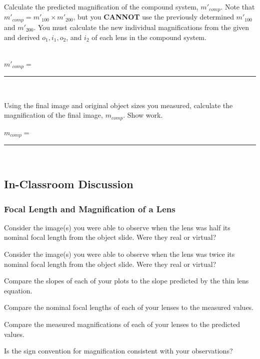 \noindent
Calculate the predicted magnification of the compound system, $m'_{comp}$.
Note that $m'_{comp}=m'_{100}\times m'_{200}$, but you
{\bf CANNOT} use the previously determined $m'_{100}$ and $m'_{200}$. You must
calculate the new individual magnifications from the given and derived
$o_1, i_1, o_2$, and $i_2$ of each lens in the compound system. \\
\vspace*{2cm} \\
\begin{center}
$m'_{comp}=$~\rule{3cm}{.1mm} \\
\end{center}
\noindent 
Using the final image and original object sizes you measured, 
calculate the magnification 
of the final image, $m_{comp}.$ 
Show work. \\
\vspace*{3cm} 
\begin{center}
$m_{comp}=$~\rule{3cm}{.1mm} ~~~~
\end{center}


\subsection{In-Classroom Discussion}
\subsubsection{Focal Length and Magnification of a Lens}
Consider the image(s) you were able to observe when the lens was half its
nominal focal length from the object slide. Were they real or virtual?
\vspace*{.3cm}

\noindent
Consider the image(s) you were able to observe when the lens was twice its
nominal focal length from the object slide. Were they real or virtual?
\vspace*{.3cm}


\noindent
Compare the slopes of each of your plots to the slope predicted by the thin lens
equation.
\vspace*{2.4cm}

\noindent 
Compare the nominal focal lengths of each of your lenses to the measured
values.
\vspace*{2.4cm}

\noindent
Compare the measured magnifications of each of your lenses to the predicted
values.
\vspace*{2.4cm}

\noindent
Is the sign convention for magnification consistent with your observations?
\vspace*{2.3cm}



